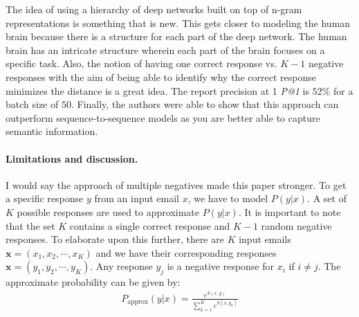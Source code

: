 \documentclass{article}
\begin{document}
The idea of using a hierarchy of deep networks built on top of n-gram representations is something that is new. This gets closer to modeling the human brain because there is a structure for each part of the deep network. The human brain has an intricate structure wherein each part of the brain focuses on a specific task. Also, the notion of having one correct response vs. $K - 1$ negative responses with the aim of being able to identify why the correct response minimizes the distance is a great idea. The report precision at 1 \textit{P@1} is $52\%$ for a batch size of $50$. Finally, the authors were able to show that this approach can outperform sequence-to-sequence models as you are better able to capture semantic information.

\paragraph{Limitations and discussion.}

I would say the approach of multiple negatives made this paper stronger. To get a specific response $y$ from an input email $x$, we have to model $P(y | x)$. A set of $K$ possible responses are used to approximate $P(y | x)$. It is important to note that the set $K$ contains a single correct response and $K - 1$ random negative responses. To elaborate upon this further, there are $K$ input emails $\textbf{x} = (x_1, x_2, \cdots, x_K)$ and we have their corresponding responses $\textbf{x} = (y_1, y_2, \cdots, y_K)$. Any response $y_j$ is a negative response for $x_i$ if $i \neq j$. The approximate probability can be given by:
\begin{align*}
    P_\text{approx}(y | x) = \frac{e^{S(x, y)}}{\sum_{k = 1}^{K} e^{S(x, y_k)}}
\end{align*}

\end{document}
